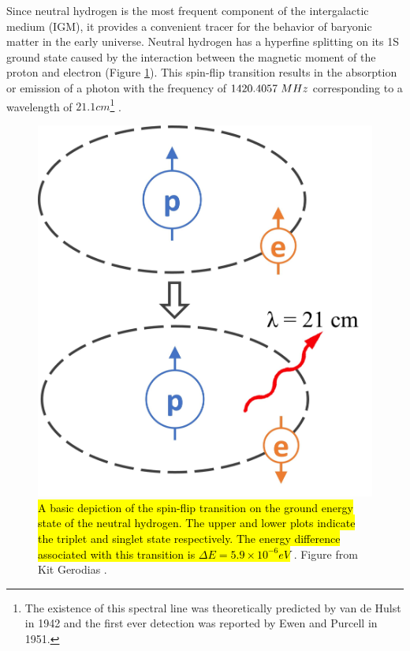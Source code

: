 \documentclass[12pt, TexShade, letterpaper]{report}
\begin{document}
Since neutral hydrogen is the most frequent component of the intergalactic medium (IGM), it provides a convenient tracer for the behavior of baryonic matter in the early universe. Neutral hydrogen has a hyperfine splitting on its 1S ground state caused by the interaction between the magnetic moment of the proton and electron (Figure \ref{fig:spinflip}). This spin-flip transition results in the absorption or emission of a photon with the frequency of $1420.4057\hspace{0.1cm} MHz$\cite{low_frequency} corresponding to a wavelength of $21.1cm$\footnote{The existence of this spectral line was theoretically predicted by van de Hulst in 1942 and the first ever detection was reported by Ewen and Purcell in 1951\cite{21century}.} \cite{21century}.\par
\begin{figure}[h!]
\centering
\includegraphics[scale =0.4]{spinflip.jpg}
\caption[Spin-flip Transition of Neutral Hydrogen]{\hl{A basic depiction of the spin-flip transition on the ground energy state of the neutral hydrogen. The upper and lower plots indicate the triplet and singlet state respectively. The energy difference associated with this transition is $\Delta E = 5.9 \times 10 ^{-6}eV$ }\cite{21century}. Figure from Kit Gerodias \cite{kit_thesis}.}
\label{fig:spinflip}
\end{figure}
\end{document}
